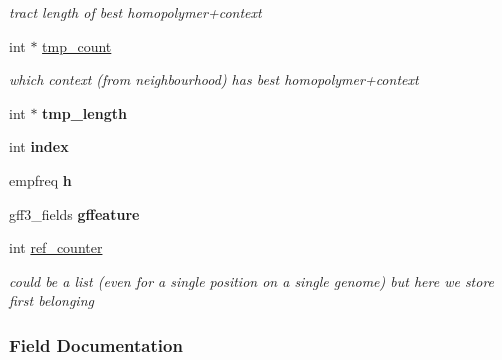 \begin{DoxyCompactItemize}
\begin{DoxyCompactList}\small\item\em tract length of best homopolymer+context \end{DoxyCompactList}\item 
\mbox{\label{structcontext__histogram__struct_a41a52c2e34beffbbab03159f0cff1f46}} 
int $\ast$ \hyperlink{structcontext__histogram__struct_a41a52c2e34beffbbab03159f0cff1f46}{tmp\+\_\+count}
\begin{DoxyCompactList}\small\item\em which context (from neighbourhood) has best homopolymer+context \end{DoxyCompactList}\item 
\mbox{\label{structcontext__histogram__struct_aba1c02911d9d9c3f5a7c22866aa3ce7c}} 
int $\ast$ {\bfseries tmp\+\_\+length}
\item 
\mbox{\label{structcontext__histogram__struct_ac98441e27668d56fe76a9fb3ded76ac7}} 
int {\bfseries index}
\item 
\mbox{\label{structcontext__histogram__struct_a910fe1204b22d330f4af40b88434452e}} 
empfreq {\bfseries h}
\item 
\mbox{\label{structcontext__histogram__struct_aff2efecde975d72f2b172a9edc53a125}} 
gff3\+\_\+fields {\bfseries gffeature}
\item 
\mbox{\label{structcontext__histogram__struct_a2fb726c1bd7c20f724364e0bce705af3}} 
int \hyperlink{structcontext__histogram__struct_a2fb726c1bd7c20f724364e0bce705af3}{ref\+\_\+counter}
\begin{DoxyCompactList}\small\item\em could be a list (even for a single position on a single genome) but here we store first belonging \end{DoxyCompactList}\end{DoxyCompactItemize}


\subsubsection{Field Documentation}
\mbox{\label{structcontext__histogram__struct_ac2bd5615e4cc759224487c986c58add3}} 
